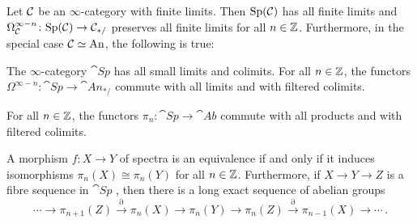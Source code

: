 \begin{lem}\label{lem:SpCHasLimits}
	Let $\mathcal{C}$ be an $\infty$-category with finite limits. Then $\mathrm{Sp}(\mathcal{C})$ has all finite limits and $\Omega_{\mathcal{C}}^{\infty-n}\colon \mathrm{Sp}(\mathcal{C})\rightarrow \mathcal{C}_{*/}$ preserves all finite limits for all $n\in\mathbb{Z}$. Furthermore, in the special case $\mathcal{C}\simeq \mathrm{An}$, the following is true:
	\begin{alphanumerate}
		\item The $\infty$-category $\cat{Sp}$ has all small limits and colimits. For all $n\in\mathbb{Z}$, the functors $\Omega^{\infty-n}\colon \cat{Sp}\rightarrow \cat{An}_{*/}$ commute with all limits and with filtered colimits.\label{enum:SpHasAllColimits}
		\item For all $n\in\mathbb{Z}$, the functors $\pi_n\colon \cat{Sp}\rightarrow \cat{Ab}$ commute with all products  and with filtered colimits.\label{enum:HomotopyGroupsOfSpectraCommuteWithFilteredColimits}
		\item A morphism $f\colon X\rightarrow Y$ of spectra is an equivalence if and only if it induces isomorphisms $\pi_n(X)\cong \pi_n(Y)$ for all $n\in\mathbb{Z}$. Furthermore, if $X\rightarrow Y\rightarrow Z$ is a fibre sequence in $\cat{Sp}$ , then there is a long exact sequence of abelian groups\label{enum:WhiteheadForSpectra}
		\begin{equation*}
			\dotsb\longrightarrow \pi_{n+1}(Z)\overset{\partial}{\longrightarrow} \pi_n(X)\longrightarrow \pi_n(Y)\longrightarrow \pi_n(Z)\overset{\partial}{\longrightarrow} \pi_{n-1}(X)\longrightarrow\dotsb\,.
		\end{equation*}
	\end{alphanumerate}
\end{lem}
